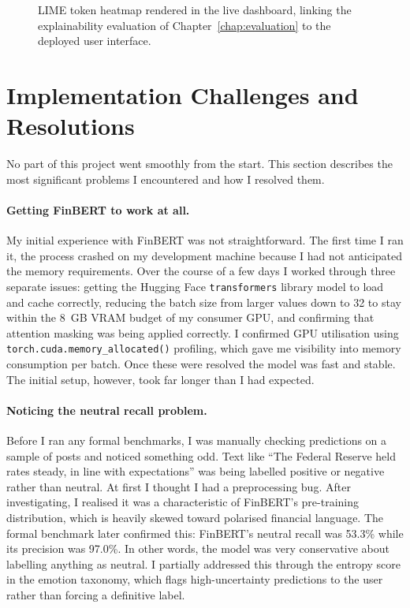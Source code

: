 \begin{figure}[p]
  \centering
  \caption{LIME token heatmap rendered in the live dashboard, linking the explainability evaluation of Chapter~\ref{chap:evaluation} to the deployed user interface.}
  \label{fig:screen_lime}
\end{figure}

\section{Implementation Challenges and Resolutions}
\label{sec:challenges}

No part of this project went smoothly from the start. This section describes the most significant problems I encountered and how I resolved them.

\paragraph{Getting FinBERT to work at all.}
My initial experience with FinBERT was not straightforward. The first time I ran it, the process crashed on my development machine because I had not anticipated the memory requirements. Over the course of a few days I worked through three separate issues: getting the Hugging Face \texttt{transformers} library \citep{wolf2020transformers} model to load and cache correctly, reducing the batch size from larger values down to 32 to stay within the 8~GB VRAM budget of my consumer GPU, and confirming that attention masking was being applied correctly. I confirmed GPU utilisation using \texttt{torch.cuda.memory\_allocated()} profiling, which gave me visibility into memory consumption per batch. Once these were resolved the model was fast and stable. The initial setup, however, took far longer than I had expected.

\paragraph{Noticing the neutral recall problem.}
Before I ran any formal benchmarks, I was manually checking predictions on a sample of posts and noticed something odd. Text like ``The Federal Reserve held rates steady, in line with expectations'' was being labelled positive or negative rather than neutral. At first I thought I had a preprocessing bug. After investigating, I realised it was a characteristic of FinBERT's pre-training distribution, which is heavily skewed toward polarised financial language. The formal benchmark later confirmed this: FinBERT's neutral recall was 53.3\% while its precision was 97.0\%. In other words, the model was very conservative about labelling anything as neutral. I partially addressed this through the entropy score in the emotion taxonomy, which flags high-uncertainty predictions to the user rather than forcing a definitive label.

